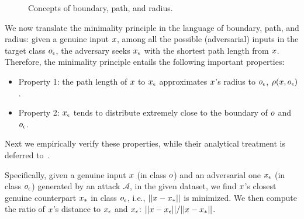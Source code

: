 
%



\begin{figure}
\centering
{}
\caption{Concepts of boundary, path, and radius. \label{fig:concept}}
\end{figure}

We now translate the minimality principle in the language of boundary, path, and radius: given a genuine input $x$, among all the possible (adversarial) inputs in the target class $o_\epsilon$, the adversary seeks $x_{\epsilon}$ with the shortest path length from $x$. Therefore, the minimality principle entails the following important properties:
\begin{itemize}
\item Property 1: the path length of $x$ to $x_{\epsilon}$ approximates $x$'s radius to $o_\epsilon$, $\rho(x, o_\epsilon)$.
\item Property 2: $x_{\epsilon}$ tends to distribute extremely close to the boundary of $o$ and $o_\epsilon$.
\end{itemize}


Next we empirically verify these properties, while their analytical treatment is deferred to~.

Specifically, given a genuine input $x$ (in class $o$) and an adversarial one $x_{\epsilon}$ (in class $o_\epsilon$) generated by an attack ${\mathcal A}$, in the given dataset, we find $x$'s closest genuine counterpart $x_*$ in class $o_\epsilon$, i.e., $||x - x_*||$ is minimized. We then compute the ratio of $x$'s distance to $x_{\epsilon}$ and $x_{\epsilon}$:
$||x - x_{\epsilon}||/||x - x_*||$.


